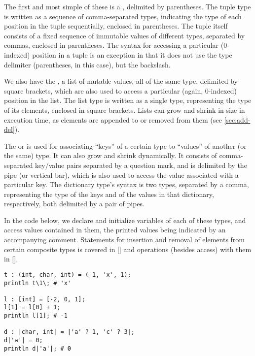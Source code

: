 The first and most simple of these is a , delimited by parentheses. The tuple type is written as a sequence of comma-separated types, indicating the type of each position in the tuple sequentially, enclosed in parentheses. The tuple itself consists of a fixed sequence of immutable values of different types, separated by commas, enclosed in parentheses. The syntax for accessing a particular (0-indexed) position in a tuple is an exception in that it does not use the type delimiter (parentheses, in this case), but the backslash.

We also have the , a list of mutable values, all of the same type, delimited by square brackets, which are also used to access a particular (again, 0-indexed) position in the list. The list type is written as a single type, representing the type of its elements, enclosed in square brackets. Lists can grow and shrink in size in execution time, as elements are appended to or removed from them (see \ref{sec:add-del}).

The  or  is used for associating ``keys'' of a certain type to ``values'' of another (or the same) type. It can also grow and shrink dynamically. It consists of comma-separated key/value pairs separated by a question mark, and is delimited by the pipe (or vertical bar), which is also used to access the value associated with a particular key. The dictionary type's syntax is two types, separated by a comma, representing the type of the keys and of the values in that dictionary, respectively, both delimited by a pair of pipes.


In the code below, we declare and initialize variables of each of these types, and access values contained in them, the printed values being indicated by an accompanying comment. Statements for insertion and removal of elements from certain composite types is covered in \ref{} and operations (besides access) with them in \ref{}.
\begin{lstlisting}[language=Gryph]
t : (int, char, int) = (-1, 'x', 1);
println t\1\; # 'x'

l : [int] = [-2, 0, 1];
l[1] = l[0] + 1;
println l[1]; # -1

d : |char, int| = |'a' ? 1, 'c' ? 3|;
d|'a'| = 0;
println d|'a'|; # 0


\end{lstlisting}
